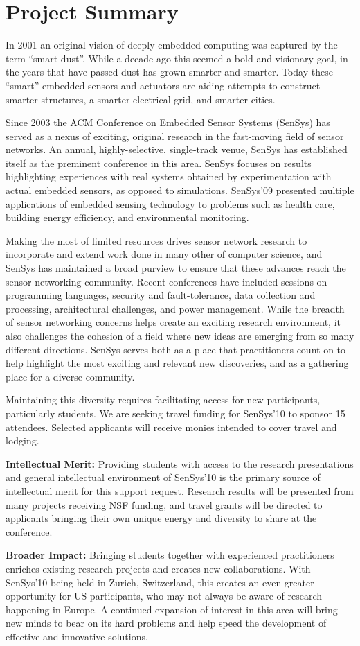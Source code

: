 \documentclass[11pt,letterpaper]{article}
\begin{document}
\section*{Project Summary}

In 2001 an original vision of deeply-embedded computing was captured by the
term ``smart dust''. While a decade ago this seemed a bold and visionary goal,
in the years that have passed dust has grown smarter and smarter. Today these
``smart'' embedded sensors and actuators are aiding attempts to construct
smarter structures, a smarter electrical grid, and smarter cities.

Since 2003 the ACM Conference on Embedded Sensor Systems (SenSys) has served
as a nexus of exciting, original research in the fast-moving field of sensor
networks. An annual, highly-selective, single-track venue, SenSys has
established itself as the preminent conference in this area.
SenSys focuses on results highlighting experiences with real systems obtained
by experimentation with actual embedded sensors, as opposed to simulations.
SenSys'09 presented multiple applications of embedded sensing technology to
problems such as health care, building energy efficiency, and environmental
monitoring.

Making the most of limited resources drives sensor network research to
incorporate and extend work done in many other of computer science, and
SenSys has maintained a broad purview to ensure that these advances reach the
sensor networking community. Recent conferences have included sessions on
programming languages, security and fault-tolerance, data collection and
processing, architectural challenges, and power management. While the breadth
of sensor networking concerns helps create an exciting research environment,
it also challenges the cohesion of a field where new ideas are emerging from
so many different directions. SenSys serves both as a place that
practitioners count on to help highlight the most exciting and relevant new
discoveries, and as a gathering place for a diverse community.

Maintaining this diversity requires facilitating access for new participants,
particularly students. We are seeking travel funding for SenSys'10 to sponsor
15 attendees. Selected applicants will receive monies intended to cover
travel and lodging.

\textbf{Intellectual Merit:} Providing students with access to the research
presentations and general intellectual environment of SenSys'10 is the
primary source of intellectual merit for this support request. Research
results will be presented from many projects receiving NSF funding, and
travel grants will be directed to applicants bringing their own unique energy
and diversity to share at the conference.

\textbf{Broader Impact:} Bringing students together with experienced
practitioners enriches existing research projects and creates new
collaborations. With SenSys'10 being held in Zurich, Switzerland, this
creates an even greater opportunity for US participants, who may not always
be aware of research happening in Europe. A continued expansion of interest
in this area will bring new minds to bear on its hard problems and help speed
the development of effective and innovative solutions.
\end{document}
